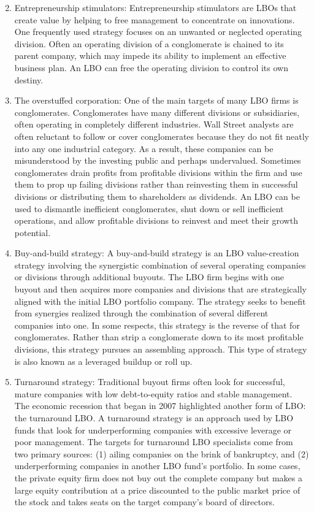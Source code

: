 \documentclass[11pt]{article}
\begin{document}
\begin{enumerate}
  \setcounter{enumi}{1}
  \item Entrepreneurship stimulators: Entrepreneurship stimulators are LBOs that create value by helping to free management to concentrate on innovations. One frequently used strategy focuses on an unwanted or neglected operating division. Often an operating division of a conglomerate is chained to its parent company, which may impede its ability to implement an effective business plan. An LBO can free the operating division to control its own destiny.

  \item The overstuffed corporation: One of the main targets of many LBO firms is conglomerates. Conglomerates have many different divisions or subsidiaries, often operating in completely different industries. Wall Street analysts are often reluctant to follow or cover conglomerates because they do not fit neatly into any one industrial category. As a result, these companies can be misunderstood by the investing public and perhaps undervalued. Sometimes conglomerates drain profits from profitable divisions within the firm and use them to prop up failing divisions rather than reinvesting them in successful divisions or distributing them to shareholders as dividends. An LBO can be used to dismantle inefficient conglomerates, shut down or sell inefficient operations, and allow profitable divisions to reinvest and meet their growth potential.

  \item Buy-and-build strategy: A buy-and-build strategy is an LBO value-creation strategy involving the synergistic combination of several operating companies or divisions through additional buyouts. The LBO firm begins with one buyout and then acquires more companies and divisions that are strategically aligned with the initial LBO portfolio company. The strategy seeks to benefit from synergies realized through the combination of several different companies into one. In some respects, this strategy is the reverse of that for conglomerates. Rather than strip a conglomerate down to its most profitable divisions, this strategy pursues an assembling approach. This type of strategy is also known as a leveraged buildup or roll up.

  \item Turnaround strategy: Traditional buyout firms often look for successful, mature companies with low debt-to-equity ratios and stable management. The economic recession that began in 2007 highlighted another form of LBO: the turnaround LBO. A turnaround strategy is an approach used by LBO funds that look for underperforming companies with excessive leverage or poor management. The targets for turnaround LBO specialists come from two primary sources: (1) ailing companies on the brink of bankruptcy, and (2) underperforming companies in another LBO fund's portfolio. In some cases, the private equity firm does not buy out the complete company but makes a large equity contribution at a price discounted to the public market price of the stock and takes seats on the target company's board of directors.

\end{enumerate}
\end{document}
